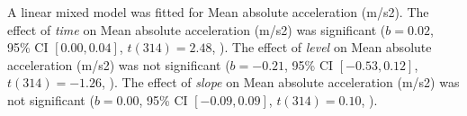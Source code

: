 A linear mixed model was fitted for Mean absolute acceleration (m/s2).
The effect of \textit{time} on Mean absolute acceleration (m/s2) was significant ($b = 0.02$, 95\% CI $[0.00, 0.04]$, $t(314) = 2.48$, ).
The effect of \textit{level} on Mean absolute acceleration (m/s2) was not significant ($b = -0.21$, 95\% CI $[-0.53, 0.12]$, $t(314) = -1.26$, ).
The effect of \textit{slope} on Mean absolute acceleration (m/s2) was not significant ($b = 0.00$, 95\% CI $[-0.09, 0.09]$, $t(314) = 0.10$, ).
